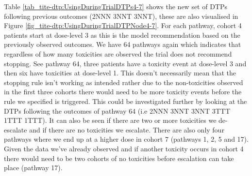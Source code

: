 Table \ref{tab_tite-dtp:UsingDuringTrialDTPs4-7} shows the new set of DTPs following previous outcomes (2NNN 3NNT 3NNT), these are also visualised in Figure \ref{fig_tite-dtp:UsingDuringTrialDTPNode4-7}. For each pathway, cohort 4 patients start at dose-level 3 as this is the model recommendation based on the previously observed outcomes. We have 64 pathways again which indicates that regardless of how many toxicities are observed the trial does not recommend stopping. See pathway 64, three patients have a toxicity event at dose-level 3 and then six have toxicities at dose-level 1. This doesn't necessarily mean that the stopping rule isn't working as intended rather due to the non-toxicities observed in the first three cohorts there would need to be more toxicity events before the rule we specified is triggered. This could be investigated further by looking at the DTPs following the outcomes of pathway 64 (i.e 2NNN 3NNT 3NNT 3TTT 1TTT 1TTT). It can also be seen if there are two or more toxicities we de-escalate and if there are no toxicities we escalate. There are also only four pathways where we end up at a higher dose in cohort 7 (pathways 1, 2, 5 and 17). Given the data we've already observed and if another toxicity occurs in cohort 4 there would need to be two cohorts of no toxicities before escalation can take place (pathway 17). 


